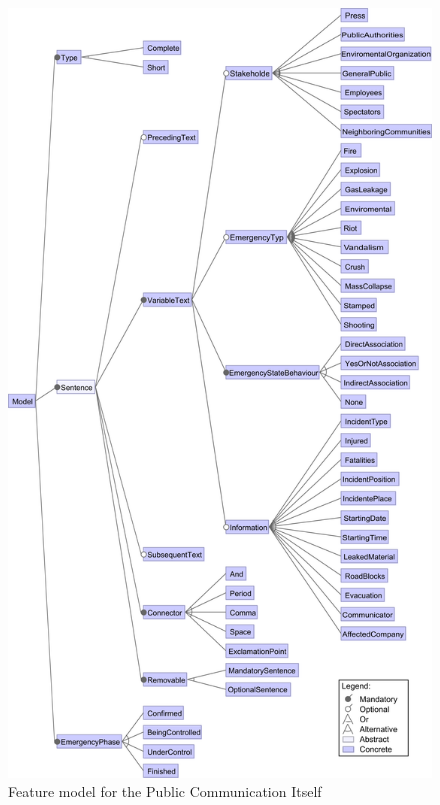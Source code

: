 \begin{figure}[]
\begin{center}
  \includegraphics[width=0.75\linewidth]{images/FMModel}
\caption{Feature model for the Public Communication Itself}
\label{fig:FMModel}
\end{center}
\end{figure}